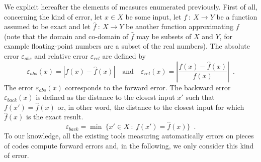 We explicit hereafter the elements of measures enumerated previously. First of all, concerning the kind of
error, let $x\in X$  be some input, let $f\ :\ X\rightarrow Y$ be a function assumed to be exact and 
let $\hat{f}\ :\ X\rightarrow Y$ be another function approximating $f$ (note that
the domain and co-domain of $\hat{f}$ may be subsets of $X$ and $Y$, for example floating-point numbers are a subset of the real numbers).
The absolute error $\varepsilon_{abs}$ and relative error $\varepsilon_{rel}$  
are defined by
\begin{equation}
\varepsilon_{abs}(x) = | f(x) - \hat{f}(x)|\quad\text{and}\quad \varepsilon_{rel}(x)= \left| \frac{f(x)-\hat{f}(x)}{f(x)}\right|\enspace .
\end{equation}
The error $\varepsilon_{abs}(x)$ corresponds to the forward error. The backward error $\varepsilon_{back}(x)$ is defined as the distance
to the closest input $x'$ such that $f(x')=\hat{f}(x)$ or, in other word, the distance to the closest input
for which $\hat{f}(x)$ is the exact result.
\begin{equation}
\varepsilon_{back} = \min\ \big\{ x'\in X\ :\ f(x')=\hat{f}(x)\big\}\enspace .
\end{equation}
To our knowledge, all the existing tools measuring automatically errors on pieces of codes compute forward errors and,
in the following, we only consider this kind of error.

